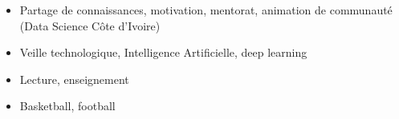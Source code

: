 \documentclass[11pt,a4paper,ragged2e, withhyper]{altacv}
\begin{document}
\smallskip
\begin{itemize}
      \item Partage de connaissances, motivation, mentorat, animation de communauté (Data Science Côte d'Ivoire)
      \item Veille technologique, Intelligence Artificielle, deep learning
      \item Lecture, enseignement
      \item Basketball, football
\end{itemize}





\clearpage


\nocite{*}






\end{document}
